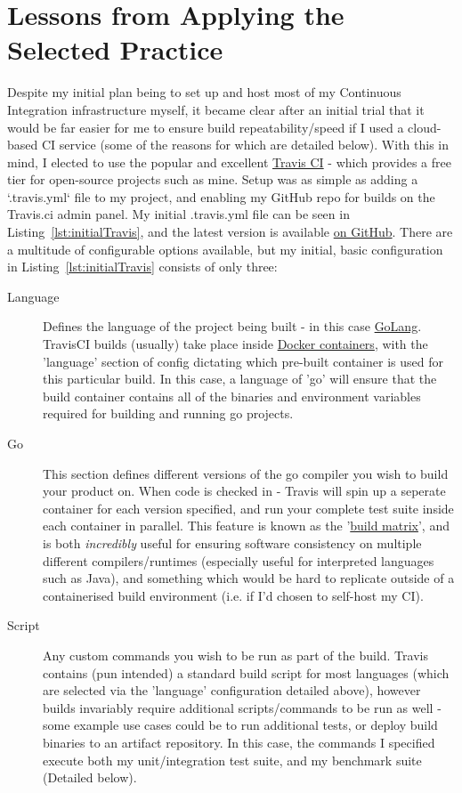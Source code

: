 \section{Lessons from Applying the Selected Practice}
\label{sec:Lessons from Applying the Selected Practice}

Despite my initial plan being to set up and host most of my Continuous
Integration infrastructure myself, it became clear after an initial trial
that it would be far easier for me to ensure build repeatability/speed if I used
a cloud-based CI service (some of the reasons for which are detailed below).
With this in mind, I elected to use the popular and
excellent \href{https://travis-ci.org/}{Travis CI} - which provides a free tier
for open-source projects such as mine. Setup was as simple as adding a
`.travis.yml` file to my project, and enabling my GitHub repo for builds on
the Travis.ci admin panel. My initial .travis.yml file can be seen in
Listing~\ref{lst:initialTravis}, and the latest version is available
\href{https://github.com/FireEater64/gamq/blob/master/.travis.yml}{on GitHub}.
There are a multitude of configurable options available, but
my initial, basic configuration in Listing~\ref{lst:initialTravis} consists of
only three:

\begin{description}
  \item[Language] Defines the language of the project being built - in this case
  \href{https://golang.org/}{GoLang}. TravisCI builds (usually) take place
  inside \href{https://www.docker.com/what-docker}{Docker containers}, with the
  'language' section of config dictating which pre-built container is used for
  this particular build. In this case, a language of 'go' will ensure that the
  build container contains all of the binaries and environment variables required
  for building and running go projects.
  \item[Go] This section defines different versions of the go compiler you wish
  to build your product on. When code is checked in - Travis will spin up a
  seperate container for each version specified, and run your complete test suite
  inside each container in parallel. This feature is known as the
  '\href{https://docs.travis-ci.com/user/customizing-the-build/#Build-Matrix}{build matrix}',
  and is both \emph{incredibly} useful for ensuring software consistency on multiple
  different compilers/runtimes (especially useful for interpreted languages such
  as Java), and something which would be hard to replicate outside of a
  containerised build environment (i.e. if I'd chosen to self-host my CI).
  \item[Script] Any custom commands you wish to be run as part of the build.
  Travis contains (pun intended) a standard build script for most languages (which
  are selected via the 'language' configuration detailed above), however builds
  invariably require additional scripts/commands to be run as well - some example
  use cases could be to run additional tests, or deploy build binaries to an
  artifact repository. In this case, the commands I specified execute both my
  unit/integration test suite, and my benchmark suite (Detailed below).
\end{description}

